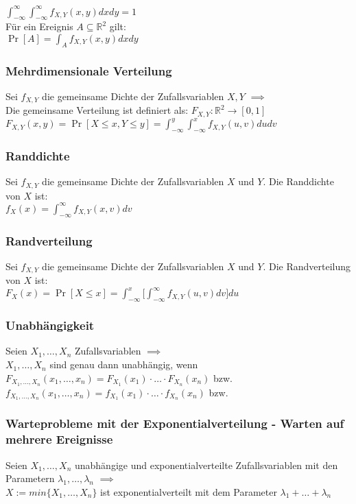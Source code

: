 \documentclass[a4paper,9pt]{extarticle}
\begin{document}
$\int_{-∞}^∞ \int_{-∞}^∞ f_{X,Y} (x,y) dx dy = 1$ \\

Für ein Ereignis $A \subseteq \mathbb{R}^2$ gilt: \\
$\Pr[A] = \int_A f_{X,Y}(x,y) dx dy$

\subsubsection*{Mehrdimensionale Verteilung}
Sei $f_{X,Y}$ die gemeinsame Dichte der Zufallsvariablen $X, Y$ $\implies$ \\
Die gemeinsame Verteilung ist definiert als: $F_{X,Y} : \mathbb{R}^2 → [0,1]$ \\
$F_{X,Y}(x,y) = \Pr[X ≤ x, Y ≤ y] = \int_{-∞}^y \int_{-∞}^x f_{X,Y} (u, v) du dv$

\subsubsection*{Randdichte}
Sei $f_{X,Y}$ die gemeinsame Dichte der Zufallsvariablen $X$ und $Y$. Die Randdichte von $X$ ist: \\
$f_X(x) = \int_{-∞}^∞ f_{X,Y} (x, v) dv$

\subsubsection*{Randverteilung}
Sei $f_{X,Y}$ die gemeinsame Dichte der Zufallsvariablen $X$ und $Y$. Die Randverteilung von $X$ ist: \\
$F_X(x) = \Pr[X ≤ x] = \int_{-∞}^x \Bigg[\int_{-∞}^∞ f_{X,Y} (u, v) dv \Bigg] du$

\subsubsection*{Unabhängigkeit}
Seien $X_1, \dots, X_n$ Zufallsvariablen $\implies$ \\
$X_1, \dots, X_n$ sind genau dann unabhängig, wenn \\
$F_{X_1, \dots, X_n}(x_1, \dots, x_n) = F_{X_1}(x_1) ⋅ \dots ⋅ F_{X_n}(x_n)$ bzw. \\
$f_{X_1, \dots, X_n}(x_1, \dots, x_n) = f_{X_1}(x_1) ⋅ \dots ⋅ f_{X_n}(x_n)$ bzw. \\

\subsubsection*{Warteprobleme mit der Exponentialverteilung - Warten auf mehrere Ereignisse}
Seien $X_1, \dots, X_n$ unabhängige und exponentialverteilte Zufallsvariablen mit den Parametern $\lambda_1, \dots, \lambda_n$ $\implies$ \\
$X := min\{X_1, \dots, X_n\}$ ist exponentialverteilt mit dem Parameter $\lambda_1 + \dots + \lambda_n$ \\
\end{document}
